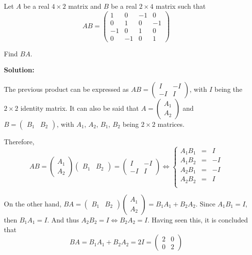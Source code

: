 \documentclass[../../main.tex]{subfiles}
\begin{document}
  \begin{shaded}
    Let $A$ be a real $4 \times 2$ matrix and $B$ be a real $2 \times 4$ matrix such that
    $$
    A B =
    \begin{pmatrix}
      1 &  0 & -1 &  0 \\
      0 &  1 &  0 & -1 \\
      -1 &  0 &  1 &  0 \\
      0 & -1 &  0 &  1
    \end{pmatrix}
    $$

    Find $B A$.
  \end{shaded}

  \textbf{Solution:}

  The previous product can be expressed as $
  A B =
  \begin{pmatrix}
    I & -I \\
    -I &  I
  \end{pmatrix}
  $, with $I$ being the $2 \times 2$ identity matrix. It can also be said that $A = \begin{pmatrix} A_1 \\ A_2 \end{pmatrix}$ and $B = \begin{pmatrix} B_1 & B_2 \end{pmatrix}$, with $A_1$, $A_2$, $B_1$, $B_2$ being $2 \times 2$ matrices.

  Therefore,
  $$
  A B =
  \begin{pmatrix} A_1 \\ A_2 \end{pmatrix}
  \begin{pmatrix} B_1 & B_2 \end{pmatrix} =
  \begin{pmatrix}
    I & -I \\
    -I &  I
  \end{pmatrix}
  \iff
  \left \{
  \begin{matrix}
    A_1 B_1 & = &  I \\
    A_1 B_2 & = & -I \\
    A_2 B_1 & = & -I \\
    A_2 B_2 & = &  I \\
  \end{matrix}
  \right .
  $$

  On the other hand, $B A = \begin{pmatrix} B_1 & B_2 \end{pmatrix} \begin{pmatrix} A_1 \\ A_2 \end{pmatrix} = B_1 A_1 + B_2 A_2$. Since $A_1 B_1 = I$, then $B_1 A_1 = I$. And thus $A_2 B_2 = I \iff B_2 A_2 = I$. Having seen this, it is concluded that
  $$
  B A = B_1 A_1 + B_2 A_2 = 2 I =
  \begin{pmatrix}
    2 & 0 \\
    0 & 2
  \end{pmatrix}
  $$
\end{document}
